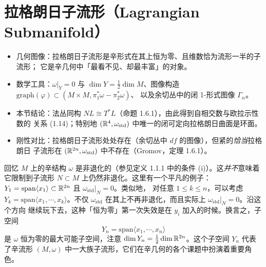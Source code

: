 \section{拉格朗日子流形（Lagrangian Submanifold）}

\begin{keytakeaways}
\begin{itemize}
  \item 几何图像：拉格朗日子流形是辛形式在其上恒为零、且维数恰为流形一半的子流形；
        它是辛几何中「最看不见、却最丰富」的对象。
  \item 数学工具：$\omega|_Y=0$ 与 $\dim Y=\frac12\dim M$、图像构造
        $\mathrm{graph}(\varphi)\subset(M\times M,\pi_1^*\omega-\pi_2^*\omega)$、
        以及余切丛中的闭 1-形式图像 $\Gamma_\alpha$。
  \item 本节结论：法丛同构 $NL\cong T^*L$（命题 1.6.1），由此得到自相交数与欧拉示性数的
        关系 (1.14)；特别地 $(\mathbb{R}^4,\omega_{\mathrm{std}})$ 中唯一的闭可定向拉格朗日曲面是环面。
  \item 刚性对比：拉格朗日子流形处处存在（余切丛中 $df$ 的图像），但紧的\emph{恰当}拉格朗日
        子流形在 $(\mathbb{R}^{2n},\omega_{\mathrm{std}})$ 中不存在（Gromov，定理 1.6.1）。
\end{itemize}
\end{keytakeaways}

回忆 $M$ 上的辛结构 $\omega$ 是非退化的（参见定义 1.1.1 中的条件 (i)）。这\emph{并不}意味着
它限制到子流形 $N\subset M$ 上仍然非退化。这里有一个平凡的例子：
$Y_1=\mathrm{span}\langle x_1\rangle\subset\mathbb{R}^{2n}$ 且 $\omega_{\mathrm{std}}|_N=0$。类似地，
对任意 $1\le k\le n$，可以考虑 $Y_k=\mathrm{span}\langle x_1,\cdots,x_k\rangle$。不仅
$\omega_{\mathrm{std}}$ 在其上不再非退化，而且实际上 $\omega_{\mathrm{std}}|_N=0$。沿这个方向
继续玩下去，这种「恒为零」第一次失效是在 $y_i$ 加入的时候。换言之，子空间
\[
  Y_n=\mathrm{span}\langle x_1,\cdots,x_n\rangle
\]
是 $\omega$ 恒为零的最大可能子空间，注意 $\dim Y_n=\frac12\dim\mathbb{R}^{2n}$。这个子空间 $Y_n$
代表了辛流形 $(M,\omega)$ 中一大族子流形，它们在辛几何的各个课题中扮演着重要角色。

